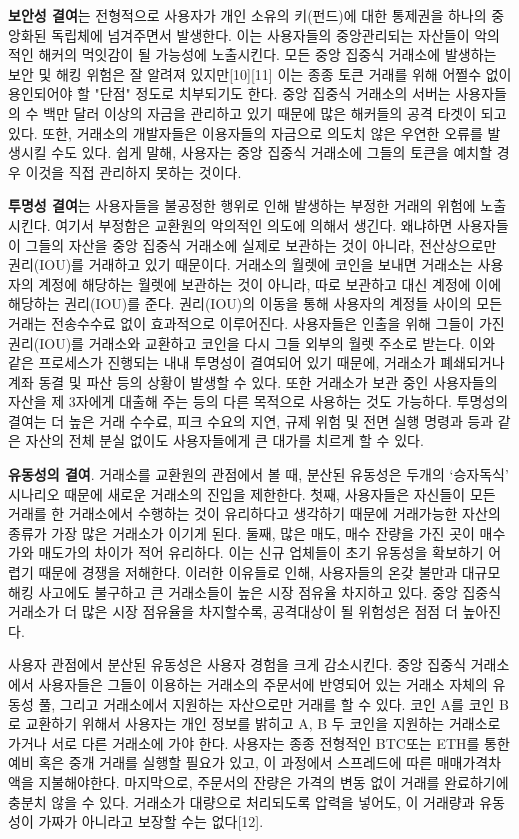\documentclass{article}
\begin{document}
\begin{multicols}{2}
\textbf{보안성 결여}는 전형적으로 사용자가 개인 소유의 키(펀드)에 대한 통제권을 하나의 중앙화된 독립체에 넘겨주면서 발생한다. 이는 사용자들의 중앙관리되는 자산들이 악의적인 해커의 먹잇감이 될 가능성에 노출시킨다. 모든 중앙 집중식 거래소에 발생하는 보안 및 해킹 위험은 잘 알려져 있지만[10][11] 이는 종종 토큰 거래를 위해 어쩔수 없이 용인되어야 할 "단점" 정도로 치부되기도 한다. 중앙 집중식 거래소의 서버는 사용자들의 수 백만 달러 이상의 자금을 관리하고 있기 때문에 많은 해커들의 공격 타겟이 되고 있다. 또한, 거래소의 개발자들은 이용자들의 자금으로 의도치 않은 우연한 오류를 발생시킬 수도 있다. 쉽게 말해, 사용자는 중앙 집중식  거래소에 그들의 토큰을 예치할 경우 이것을 직접 관리하지 못하는 것이다.

\textbf{투명성 결여}는 사용자들을 불공정한 행위로 인해 발생하는 부정한 거래의 위험에 노출시킨다. 여기서 부정함은 교환원의 악의적인 의도에 의해서 생긴다. 왜냐하면 사용자들이 그들의 자산을 중앙 집중식 거래소에 실제로 보관하는 것이 아니라, 전산상으로만 권리(IOU)를 거래하고 있기 때문이다. 거래소의 월렛에 코인을 보내면 거래소는 사용자의 계정에 해당하는 월렛에 보관하는 것이 아니라, 따로 보관하고 대신 계정에 이에 해당하는 권리(IOU)를 준다. 권리(IOU)의 이동을 통해 사용자의 계정들 사이의 모든 거래는 전송수수료 없이 효과적으로 이루어진다. 사용자들은 인출을 위해 그들이 가진 권리(IOU)를 거래소와 교환하고 코인을 다시 그들 외부의 월렛 주소로 받는다. 이와 같은 프로세스가 진행되는 내내 투명성이 결여되어 있기 때문에, 거래소가 폐쇄되거나 계좌 동결 및 파산 등의 상황이 발생할 수 있다. 또한 거래소가 보관 중인 사용자들의 자산을 제 3자에게 대출해 주는 등의 다른 목적으로 사용하는 것도 가능하다. 투명성의 결여는 더 높은 거래 수수료, 피크 수요의 지연, 규제 위험 및 전면 실행 명령과 등과 같은 자산의 전체 분실 없이도 사용자들에게 큰 대가를 치르게 할 수 있다.

\textbf{유동성의 결여}. 거래소를 교환원의 관점에서 볼 때, 분산된 유동성은 두개의 ‘승자독식’ 시나리오 때문에 새로운 거래소의 진입을 제한한다. 첫째, 사용자들은 자신들이 모든 거래를 한 거래소에서 수행하는 것이 유리하다고 생각하기 때문에 거래가능한 자산의 종류가 가장 많은 거래소가 이기게 된다. 둘째, 많은 매도, 매수 잔량을 가진 곳이 매수가와 매도가의 차이가 적어 유리하다. 이는 신규 업체들이 초기 유동성을 확보하기 어렵기 때문에 경쟁을 저해한다. 이러한 이유들로 인해, 사용자들의 온갖 불만과 대규모 해킹 사고에도 불구하고 큰 거래소들이 높은 시장 점유율 차지하고 있다. 중앙 집중식 거래소가 더 많은 시장 점유율을 차지할수록, 공격대상이 될 위험성은 점점 더 높아진다.

사용자 관점에서 분산된 유동성은 사용자 경험을 크게 감소시킨다. 중앙 집중식 거래소에서 사용자들은 그들이 이용하는 거래소의 주문서에 반영되어 있는 거래소 자체의 유동성 풀, 그리고 거래소에서 지원하는 자산으로만 거래를 할 수 있다. 코인 A를 코인 B로 교환하기 위해서 사용자는 개인 정보를 밝히고 A, B 두 코인을 지원하는 거래소로 가거나 서로 다른 거래소에 가야 한다. 사용자는 종종 전형적인 BTC또는 ETH를 통한 예비 혹은 중개 거래를 실행할 필요가 있고, 이 과정에서 스프레드에 따른 매매가격차액을 지불해야한다. 마지막으로, 주문서의 잔량은 가격의 변동 없이 거래를 완료하기에 충분치 않을 수 있다. 거래소가 대량으로 처리되도록 압력을 넣어도, 이 거래량과 유동성이 가짜가 아니라고 보장할 수는  없다[12].


\end{multicols}
\end{document}
